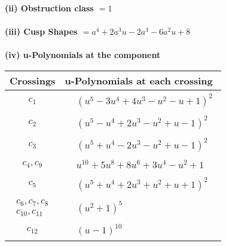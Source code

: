 \documentclass[1p]{elsarticle_modified}
\theoremstyle{definition}
\begin{document}
\flushleft \textbf{(ii) Obstruction class $= 1$}\\~\\
\flushleft \textbf{(iii) Cusp Shapes $= a^4+2 a^3 u-2 a^3-6 a^2 u+8$}\\~\\
\newpage\renewcommand{\arraystretch}{1}
\flushleft \textbf{(iv) u-Polynomials at the component}\newline \\
\begin{tabular}{m{50pt}|m{274pt}}
Crossings & \hspace{64pt}u-Polynomials at each crossing \\
\hline $$\begin{aligned}c_{1}\end{aligned}$$&$\begin{aligned}
&(u^5-3 u^4+4 u^3- u^2- u+1)^2
\end{aligned}$\\
\hline $$\begin{aligned}c_{2}\end{aligned}$$&$\begin{aligned}
&(u^5- u^4+2 u^3- u^2+u-1)^2
\end{aligned}$\\
\hline $$\begin{aligned}c_{3}\end{aligned}$$&$\begin{aligned}
&(u^5+u^4-2 u^3- u^2+u-1)^2
\end{aligned}$\\
\hline $$\begin{aligned}c_{4},c_{9}\end{aligned}$$&$\begin{aligned}
&u^{10}+5 u^8+8 u^6+3 u^4- u^2+1
\end{aligned}$\\
\hline $$\begin{aligned}c_{5}\end{aligned}$$&$\begin{aligned}
&(u^5+u^4+2 u^3+u^2+u+1)^2
\end{aligned}$\\
\hline $$\begin{aligned}c_{6},c_{7},c_{8}\\c_{10},c_{11}\end{aligned}$$&$\begin{aligned}
&(u^2+1)^5
\end{aligned}$\\
\hline $$\begin{aligned}c_{12}\end{aligned}$$&$\begin{aligned}
&(u-1)^{10}
\end{aligned}$\\
\hline
\end{tabular}\\~\\
\end{document}
